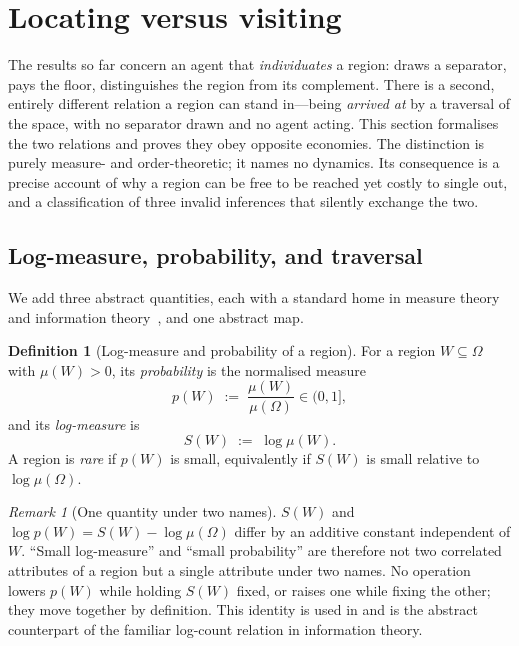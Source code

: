 \documentclass[11pt,twocolumn,a4paper]{article}
\theoremstyle{thmstyle}
\theoremstyle{definition}
\newtheorem{definition}[theorem]{Definition}
\theoremstyle{remark}
\newtheorem{remark}[theorem]{Remark}
\newcommand{\Space}{\Omega}
\begin{document}
\section{Locating versus visiting}
\label{sec:locating}

The results so far concern an agent that \emph{individuates} a region: draws a
separator, pays the floor, distinguishes the region from its complement. There is
a second, entirely different relation a region can stand in---being \emph{arrived
at} by a traversal of the space, with no separator drawn and no agent acting. This
section formalises the two relations and proves they obey opposite economies. The
distinction is purely measure- and order-theoretic; it names no dynamics. Its
consequence is a precise account of why a region can be free to be reached yet
costly to single out, and a classification of three invalid inferences that
silently exchange the two.

\subsection{Log-measure, probability, and traversal}

We add three abstract quantities, each with a standard home in measure theory and
information theory~\citep{shannon1948,cover2006}, and one abstract map.

\begin{definition}[Log-measure and probability of a region]
\label{def:logmeasure}
For a region $W\subseteq\Space$ with $\mu(W)>0$, its \emph{probability} is the
normalised measure
\[
p(W)\;:=\;\frac{\mu(W)}{\mu(\Space)}\in(0,1],
\]
and its \emph{log-measure} is
\[
S(W)\;:=\;\log\mu(W).
\]
A region is \emph{rare} if $p(W)$ is small, equivalently if $S(W)$ is small
relative to $\log\mu(\Space)$.
\end{definition}

\begin{remark}[One quantity under two names]
\label{rem:one-quantity}
$S(W)$ and $\log p(W)=S(W)-\log\mu(\Space)$ differ by an additive constant
independent of $W$. ``Small log-measure'' and ``small probability'' are therefore
not two correlated attributes of a region but a single attribute under two names.
No operation lowers $p(W)$ while holding $S(W)$ fixed, or raises one while fixing
the other; they move together by definition. This identity is used in
 and is the abstract counterpart of the familiar
log-count relation in information theory.
\end{remark}
\end{document}
